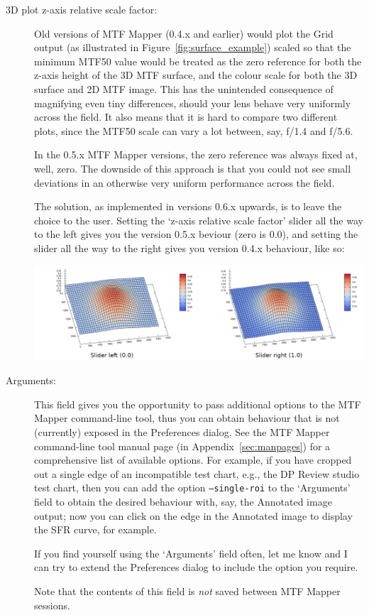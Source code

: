 \documentclass[a4paper]{article}
\begin{document}
\begin{description}
\item[3D plot z-axis relative scale factor:]
Old versions of MTF Mapper (0.4.x and earlier) would plot the \textsf{Grid}
output (as illustrated in Figure~\ref{fig:surface_example}) scaled so that
the minimum MTF50 value would be treated as the zero reference for both the
z-axis height of the 3D MTF surface, and the colour scale for both the 3D
surface and 2D MTF image. This has the unintended consequence of magnifying
even tiny differences, should your lens behave very uniformly across the
field. It also means that it is hard to compare two different plots, since
the MTF50 scale can vary a lot between, say, f/1.4 and f/5.6.

In the 0.5.x MTF Mapper versions, the zero reference was always fixed at,
well, zero. The downside of this approach is that you could not see small
deviations in an otherwise very uniform performance across the field.

The solution, as implemented in versions 0.6.x upwards, is to leave the
choice to the user. Setting the `z-axis relative scale factor' slider all
the way to the left gives you the version 0.5.x beviour (zero is 0.0), and setting the
slider all the way to the right gives you version 0.4.x behaviour, like so:

\parbox{0.85\textwidth}{
\centering
\includegraphics[width=\textwidth]{figures/z_axis_scale}
}

\item[Arguments:]
This field gives you the opportunity to pass additional options to the MTF
Mapper command-line tool, thus you can obtain behaviour that is not
(currently) exposed in the \textsf{Preferences} dialog. See the MTF Mapper
command-line tool manual page (in Appendix~\ref{sec:manpages}) for a
comprehensive list of available options. For example, if you have cropped
out a single edge of an incompatible test chart, e.g., the DP Review studio test
chart, then you can add the option \texttt{--single-roi} to the `Arguments'
field to obtain the desired behaviour with, say, the \textsf{Annotated
image} output; now you can click on the edge in the \textsf{Annotated image}
to display the SFR curve, for example.

If you find yourself using the `Arguments' field often, let me know and I
can try to extend the \textsf{Preferences} dialog to include the option you
require.

Note that the contents of this field is \emph{not} saved between MTF Mapper
sessions.

\end{description}
\end{document}
